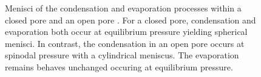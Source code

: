 \documentclass[../../thesis.tex]{subfiles}
\begin{document}
\begin{figure}[htb]
{
              \label{fig:open-pore-process}
            }
    \caption{Menisci of the condensation and evaporation processes within a closed pore \protect{} and an open pore \protect{}. For a closed pore, condensation and evaporation both occur at equilibrium pressure yielding spherical menisci. In contrast, the condensation in an open pore occurs at spinodal pressure with a cylindrical meniscus. The evaporation remains behaves unchanged occuring at equilibrium pressure.}
    \label{fig:pore-cond-evap-model}
\end{figure}
\end{document}
